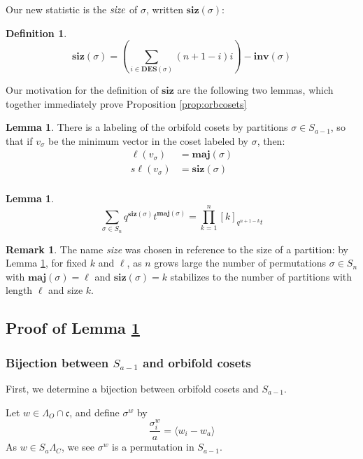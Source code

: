 \documentclass{amsart}[12pt]
\theoremstyle{definition}
\newtheorem{lemma}[dummy]{Lemma}
\newtheorem{definition}[dummy]{Definition}
\newtheorem{remark}[dummy]{Remark}
\newcommand{\sk}{s\ell}
\newcommand{\inv}{\mathbf{inv}}
\newcommand{\DES}{\mathbf{DES}}
\newcommand{\maj}{\mathbf{maj}}
\newcommand{\siz}{\mathbf{siz}}
\newcommand{\cone}{\mathfrak{c}}
\begin{document}
Our new statistic is the $\emph{size}$ of $\sigma$, written $\siz(\sigma)$: 

\begin{definition} \label{def:sizepermutation}
$$\siz(\sigma)=\left(\sum_{i\in\DES(\sigma)} (n+1-i)i\right)-\inv(\sigma)$$
\end{definition}


Our motivation for the definition of $\siz$ are the following two lemmas, which together immediately prove Proposition \ref{prop:orbcosets}

\begin{lemma} \label{lem:sizmaj1}
There is a labeling of the orbifold cosets by partitions $\sigma\in S_{a-1}$, so that if $v_\sigma$ be the minimum vector in the coset labeled by $\sigma$, then:
\begin{align*}
\ell(v_\sigma)&=\maj(\sigma) \\
\sk(v_\sigma)&=\siz(\sigma)\\
\end{align*}

\end{lemma}

\begin{lemma} \label{lem:sizmaj2}
$$\sum_{\sigma\in S_n} q^{\siz(\sigma)} t^{\maj(\sigma)}=\prod_{k=1}^n [k]_{q^{n+1-k}t}$$
\end{lemma}


\begin{remark}
The name \emph{size} was chosen in reference to the size of a partition: by Lemma \ref{lem:sizmaj2}, for fixed $k$ and $\ell$, as $n$ grows large the number of permutations $\sigma\in S_n$ with $\maj(\sigma)=\ell$ and $\siz(\sigma)=k$ stabilizes to the number of partitions with length $\ell$ and size $k$.
\end{remark}


\subsection{Proof of Lemma \ref{lem:sizmaj1}}
\subsubsection{Bijection between $S_{a-1}$ and orbifold cosets}
First, we determine a bijection between orbifold cosets and $S_{a-1}$.  


Let $w\in\Lambda_O\cap \cone$, and define $\sigma^w$ by 
$$\frac{\sigma^w_i}{a}=\langle w_{i}-w_a\rangle$$
As $w\in S_a\Lambda_C$, we see $\sigma^w$ is a permutation in $S_{a-1}$.
\end{document}
